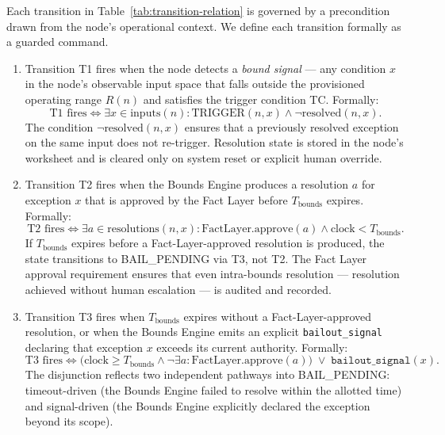 Each transition in Table~\ref{tab:transition-relation} is governed by a precondition drawn from the node's operational context. We define each transition formally as a guarded command.

\begin{enumerate}
\item[\textbf{T1: IDLE $\rightarrow$ BOUNDED (trigger).}] Transition T1 fires when the node detects a \emph{bound signal} — any condition $x$ in the node's observable input space that falls outside the provisioned operating range $R(n)$ and satisfies the trigger condition TC. Formally:
\begin{equation}
\text{T1 fires} \iff \exists x \in \text{inputs}(n) : \text{TRIGGER}(n, x) \land \neg\text{resolved}(n, x). \tag{T1}
\end{equation}
The condition $\neg\text{resolved}(n, x)$ ensures that a previously resolved exception on the same input does not re-trigger. Resolution state is stored in the node's worksheet and is cleared only on system reset or explicit human override.

\item[\textbf{T2: BOUNDED $\rightarrow$ HUMAN\_ACKNOWLEDGED (intra-bounds resolution).}] Transition T2 fires when the Bounds Engine produces a resolution $a$ for exception $x$ that is approved by the Fact Layer before $T_{\text{bounds}}$ expires. Formally:
\begin{equation}
\text{T2 fires} \iff \exists a \in \text{resolutions}(n, x) : \text{FactLayer.approve}(a) \land \text{clock} < T_{\text{bounds}}. \tag{T2}
\end{equation}
If $T_{\text{bounds}}$ expires before a Fact-Layer-approved resolution is produced, the state transitions to BAIL\_PENDING via T3, not T2. The Fact Layer approval requirement ensures that even intra-bounds resolution — resolution achieved without human escalation — is audited and recorded.

\item[\textbf{T3: BOUNDED $\rightarrow$ BAIL\_PENDING (escalation).}] Transition T3 fires when $T_{\text{bounds}}$ expires without a Fact-Layer-approved resolution, or when the Bounds Engine emits an explicit \texttt{bailout\_signal} declaring that exception $x$ exceeds its current authority. Formally:
\begin{equation}
\text{T3 fires} \iff \bigl(\text{clock} \geq T_{\text{bounds}} \land \neg\exists a : \text{FactLayer.approve}(a)\bigr) \;\lor\; \texttt{bailout\_signal}(x). \tag{T3}
\end{equation}
The disjunction reflects two independent pathways into BAIL\_PENDING: timeout-driven (the Bounds Engine failed to resolve within the allotted time) and signal-driven (the Bounds Engine explicitly declared the exception beyond its scope).


\end{enumerate}
